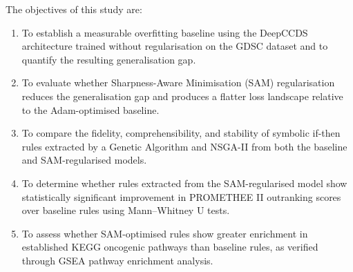The objectives of this study are:
\begin{enumerate}
    \item To establish a measurable overfitting baseline using the DeepCCDS architecture trained without regularisation on the GDSC dataset and to quantify the resulting generalisation gap.
    \item To evaluate whether Sharpness-Aware Minimisation (SAM) regularisation reduces the generalisation gap and produces a flatter loss landscape relative to the Adam-optimised baseline.
    \item To compare the fidelity, comprehensibility, and stability of symbolic if-then rules extracted by a Genetic Algorithm and NSGA-II from both the baseline and SAM-regularised models.
    \item To determine whether rules extracted from the SAM-regularised model show statistically significant improvement in PROMETHEE II outranking scores over baseline rules using Mann--Whitney U tests.
    \item To assess whether SAM-optimised rules show greater enrichment in established KEGG oncogenic pathways than baseline rules, as verified through GSEA pathway enrichment analysis.
\end{enumerate}